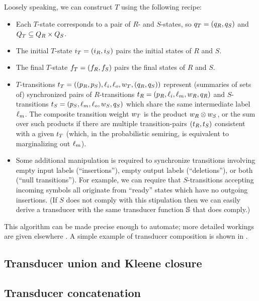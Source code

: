 \documentclass[english]{article}
\begin{document}
Loosely speaking, we can construct $T$ using the following recipe:
\begin{itemize}
\item Each $T$-state corresponds to a pair of $R$- and $S$-states,
so $q_T = (q_R, q_S)$
and $Q_T \subseteq Q_R \times Q_S$.
\item The initial $T$-state $i_T=(i_R,i_S)$ pairs the initial states of $R$ and $S$.
\item The final $T$-state $f_T=(f_R,f_S)$ pairs the final states of $R$ and $S$.
\item $T$-transitions
$t_T = ((p_R,p_S),\ell_i,\ell_o,w_T,(q_R,q_S))$
represent (summaries of sets of) synchronized pairs of $R$-transitions
$t_R = (p_R,\ell_i,\ell_m,w_R,q_R)$
and $S$-transitions
$t_S = (p_S,\ell_m,\ell_o,w_S,q_S)$
which share the same intermediate label $\ell_m$.
The composite transition weight $w_T$ is the product $w_R \otimes w_S$,
or the sum over such products if there are multiple transition-pairs $(t_R,t_S)$
consistent with a given $t_T$
(which, in the probabilistic semiring, is equivalent to marginalizing out $\ell_m$).
\item Some additional manipulation is required to synchronize
transitions involving empty input labels (``insertions''),
empty output labels (``deletions''),
or both (``null transitions'').
For example, we can require that $S$-transitions accepting incoming symbols
all originate from ``ready'' states which have no outgoing insertions.
(If $S$ does not comply with this stipulation then we can easily derive a transducer
with the same transducer function $\mathbb{S}$ that does comply.)
\end{itemize}

This algorithm can be made precise enough to automate;
more detailed workings are given elsewhere \cite{PereiraRiley1996,MohriPereiraRiley2000,Holmes2003,Holmes2007,WestessonEtAlArxiv2012,WestessonEtAl2012}.
A simple example of transducer composition is shown in .

\subsection{Transducer union and Kleene closure}


\subsection{Transducer concatenation}
\end{document}
